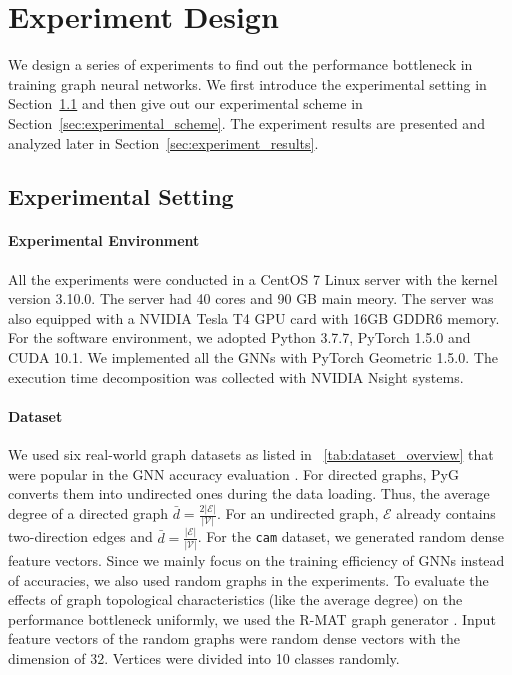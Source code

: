 \section{Experiment Design}

We design a series of experiments to find out the performance bottleneck in training graph neural networks.
We first introduce the experimental setting in Section~\ref{sec:experimental_env} and then give out our experimental scheme in Section~\ref{sec:experimental_scheme}.
The experiment results are presented and analyzed later in Section~\ref{sec:experiment_results}.

\subsection{Experimental Setting}
\label{sec:experimental_env}

\paragraph{Experimental Environment}
All the experiments were conducted in a CentOS 7 Linux server with the kernel version 3.10.0.
The server had 40 cores and 90 GB main meory.
The server was also equipped with a NVIDIA Tesla T4 GPU card with 16GB GDDR6 memory.
For the software environment, we adopted Python 3.7.7, PyTorch 1.5.0 and CUDA 10.1.
We implemented all the GNNs with PyTorch Geometric 1.5.0.
The execution time decomposition was collected with NVIDIA Nsight systems.

\paragraph{Dataset}
We used six real-world graph datasets as listed in \tablename~\ref{tab:dataset_overview} that were popular in the GNN accuracy evaluation \cite{yang2016_revisiting_semisupervise, zeng2020_graphsaint, shchur2018_pitfall_of_gnn}.
For directed graphs, PyG converts them into undirected ones during the data loading.
Thus, the average degree of a directed graph $\bar{d}=\frac{2|\mathcal{E}|}{|\mathcal{V}|}$.
For an undirected graph, $\mathcal{E}$ already contains two-direction edges and $\bar{d}=\frac{|\mathcal{E}|}{|\mathcal{V}|}$.
For the \texttt{cam} dataset, we generated random dense feature vectors.
Since we mainly focus on the training efficiency of GNNs instead of accuracies, we also used random graphs in the experiments.
To evaluate the effects of graph topological characteristics (like the average degree) on the performance bottleneck uniformly, we used the R-MAT graph generator \cite{rmat-generator}.
Input feature vectors of the random graphs were random dense vectors with the dimension of 32.
Vertices were divided into 10 classes randomly.

